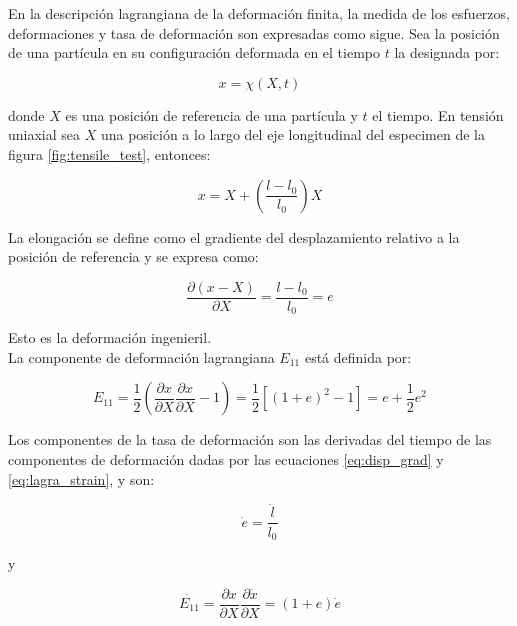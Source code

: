 En la descripción lagrangiana de la deformación finita, la medida de los esfuerzos, 
deformaciones y tasa de deformación son expresadas como sigue. Sea la posición 
de una partícula en su configuración deformada en el tiempo $t$ la designada por: 

\begin{equation}
x = \chi(X,t)
\end{equation}

donde $X$ es una posición de referencia de una partícula y $t$ el tiempo. En 
tensión uniaxial sea $X$ una posición a lo largo del eje longitudinal del 
especimen de la figura \ref{fig:tensile_test}, entonces:

\begin{equation}
x = X + \left( \frac{l-l_0}{l_0} \right) X
\end{equation}

La elongación se define como el gradiente del desplazamiento relativo a la posición 
de referencia y se expresa como:

\begin{equation} \label{eq:disp_grad}
\frac{\partial (x-X)}{\partial X} = \frac{l-l_0}{l_0} = e
\end{equation}

Esto es la deformación ingenieril. \\

La componente de deformación lagrangiana $E_{11}$ está definida por:

\begin{equation} \label{eq:lagra_strain}
E_{11} = \frac{1}{2} \left( \frac{\partial x}{\partial X} \frac{\partial x}{\partial X} - 1 \right) = 
\frac{1}{2} \left[ (1+e)^2 - 1 \right] = e + \frac{1}{2} e^2
\end{equation}


Los componentes de la tasa de deformación son las derivadas del tiempo de las componentes 
de deformación dadas por las ecuaciones \ref{eq:disp_grad} y \ref{eq:lagra_strain}, y son:

\begin{equation}
\dot{e} = \frac{\dot{l}}{l_0}
\end{equation}

y 

\begin{equation}
\dot{E_{11}} = \frac{\partial x}{\partial X} \frac{\partial \dot{x}}{\partial X} = 
(1+e)\dot{e}
\end{equation}

